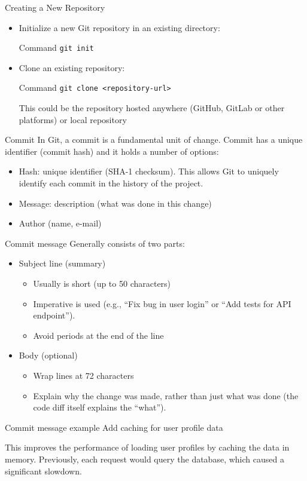 \documentclass{beamer}
\begin{document}
\begin{frame}{Creating a New Repository}
  \begin{itemize}
    \item Initialize a new Git repository in an existing directory:
    \begin{block}{Command}
        \texttt{git init}
    \end{block}
    \item Clone an existing repository:
    \begin{block}{Command}
        \texttt{git clone <repository-url>}
    \end{block}
      This could be the repository hosted anywhere (GitHub, GitLab or other platforms) or local repository
  \end{itemize}
\end{frame}

\begin{frame}{Commit}
  In Git, a commit is a fundamental unit of change.
  Commit has a unique identifier (commit hash) and it holds a number of options:
  \begin{itemize}
    \item Hash: unique identifier (SHA-1 checksum).
        This allows Git to uniquely identify each commit in the history of the project.
    \item Message: description (what was done in this change)
    \item Author (name, e-mail)
  \end{itemize}
\end{frame}

\begin{frame}{Commit message}
  Generally consists of two parts:
  \begin{itemize}
    \item Subject line (summary)
      \begin{itemize}
        \item Usually is short (up to 50 characters)
        \item Imperative is used (e.g., ``Fix bug in user login'' or ``Add tests for API endpoint'').
        \item Avoid periods at the end of the line
      \end{itemize}
    \item Body (optional)
      \begin{itemize}
        \item Wrap lines at 72 characters
        \item Explain why the change was made, rather than just what was done (the code diff itself explains the ``what'').
      \end{itemize}
  \end{itemize}
  \begin{block}{Commit message example}
    Add caching for user profile data\vspace{1em}

    This improves the performance of loading user profiles by
    caching the data in memory. Previously, each request would
    query the database, which caused a significant slowdown.
  \end{block}
\end{frame}
\end{document}
